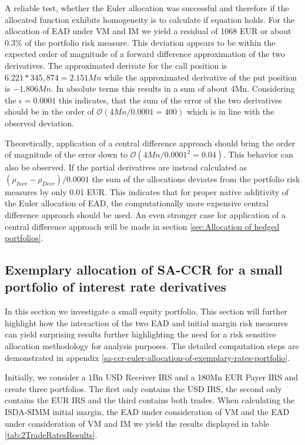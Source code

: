 \documentclass[../Thesis_AHoecherl.tex]{subfiles}
\begin{document}
    A reliable test, whether the Euler allocation was successful and therefore if the allocated function exhibits homogeneity is to calculate if equation  holds. For the allocation of EAD under VM and IM we yield a residual of 1068 EUR or about 0.3\% of the portfolio risk measure. This deviation appears to be within the expected order of magnitude of a forward difference approximation of the two derivatives. 
    The approximated derivate for the call position is $6.221 * 345,874 = 2.151Mn$ while the approximated derivative of the put position is $-1.806Mn$. In absolute terms this results in a sum of about 4Mn. Considering the $\epsilon = 0.0001$ this indicates, that the sum of the error of the two derivatives should be in the order of $\mathcal{O}\left(4Mn/0.0001 = 400\right)$ which is in line with the observed deviation.

    Theoretically, application of a central difference approach should bring the order of magnitude of the error down to $\mathcal{O}\left(4Mn/0.0001^2 = 0.04\right)$.
     This behavior can also be observed. 
    If the partial derivatives are instead calculated as $(\rho_{Incr}-\rho_{Decr})/0.0001$ the sum of the allocations deviates from the portfolio risk measures by only 0.01 EUR. 
    This indicates that for proper native additivity of the Euler allocation of EAD, the computationally more expensive central difference approach should be used.
    An even stronger case for application of a central difference approach will be made in section \ref{sec:Allocation of hedged portfolios}.

    \subsection{Exemplary allocation of SA-CCR for a small portfolio of interest rate derivatives\label{sec:Exemplary allocation of SA-CCR for a small portfolio of interest rate derivatives}}

    In this section we investigate a small equity portfolio. This section will further highlight how the interaction of the two EAD and initial margin risk measures can yield surprising results further highlighting the need for a risk sensitive allocation methodology for analysis purposes. The detailed computation steps are demonstrated in appendix \ref{sa-ccr-euler-allocation-of-exemplary-rates-portfolio}.

    Initially, we consider a 1Bn USD Receiver IRS and a 180Mn EUR Payer IRS and create three portfolios. The first only contains the USD IRS, the second only contains the EUR IRS and the third contains both trades.
    When calculating the ISDA-SIMM initial margin, the EAD under consideration of VM and the EAD under consideration of VM and IM we yield the results displayed in table \ref{tab:2TradeRatesResults}.
\end{document}
